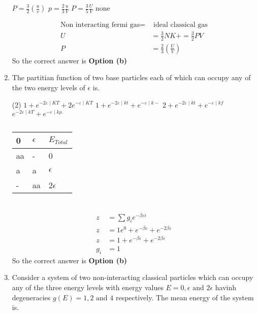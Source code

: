 \begin{enumerate}
\begin{tasks}
		\task[\textbf{a.}]$P=\frac{3}{2}\left(\frac{u}{v}\right)$
		\task[\textbf{b.}]$p=\frac{2}{3} \frac{u}{V}$
		\task[\textbf{c.}]$ P=\frac{3}{5} \frac{U}{V}$
		\task[\textbf{d.}]  none
	\end{tasks}
\begin{answer}
	\begin{align*}
	\text{Non interacting fermi gas=}&\text{ ideal classical gas}\\
	U&=\frac{3}{2} N K+=\frac{3}{2} P V\\
	P&=\frac{2}{3}\left(\frac{U}{V}\right)
	\end{align*}
	So the correct answer is \textbf{Option (b)}
\end{answer}
\item The partitian function of two base particles each of which can occupy any of the two energy levels of $\epsilon$ is.
 \begin{tasks}(2)
	\task[\textbf{a.}] $1+e^{-2 \varepsilon \mid K T}+2 e^{-\varepsilon \mid K T}$
	\task[\textbf{b.}] $1+e^{-2 \varepsilon \mid k t}+e^{-\varepsilon \mid k-}$
	\task[\textbf{c.}]$2+e^{-2 \varepsilon \mid k t}+e^{-\varepsilon \mid k f}$
	\task[\textbf{d.}] $e^{-2 \varepsilon \mid k T}+e^{-\varepsilon \mid k \rho \text {. }}$
\end{tasks}  
\begin{answer}$\left. \right. $\\
\begin{tabular}{|p{1cm}|p{1cm}|p{2cm}|}
	\hline
	0 & $\epsilon$ & $E_{Total}$\\\hline
	aa&-&0\\\hline
	a&a&$\epsilon$\\\hline
	-&aa&2$\epsilon$\\\hline
\end{tabular}\\
\begin{align*}
	z&=\sum g_{i} e^{-\beta \varepsilon i} \\
	z&=1 e^{0}+e^{-\beta \varepsilon}+e^{-2 \beta \varepsilon} \\
	z&=1+e^{-\beta \varepsilon}+e^{-2 \beta \varepsilon}\\
	g_{i}&=1
\end{align*}
	So the correct answer is \textbf{Option (b)}
\end{answer}
\item Consider a system of two non-interacting classical particles which can occupy any of the three energy levels with energy values $E=0,\epsilon \text{ and }2\epsilon$ havinh degeneracies $g(E)=1,2 \text{ and } 4$ respectively. The mean energy of the system is.

\end{enumerate}
